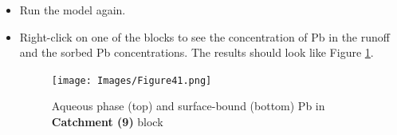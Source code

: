 \begin{itemize}
\item Run the model again. 

\item Right-click on one of the blocks to see the concentration of Pb in the runoff and the sorbed Pb concentrations. The results should look like Figure \ref{fig:41}. 

\begin{figure}[!ht]
\begin{center}
\texttt{[image: Images/Figure41.png]} \\
\caption{Aqueous phase (top) and surface-bound (bottom) Pb in \textbf{Catchment (9)} block}\label{fig:41} 
\end{center}
\end{figure}



\end{itemize}

